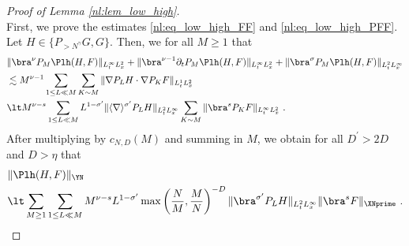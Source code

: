 \documentclass[11pt]{article}
\begin{document}
\begin{proof}[Proof of Lemma \ref{nl:lem_low_high}]~\\
First, we prove the estimates \eqref{nl:eq_low_high_FF} and \eqref{nl:eq_low_high_PFF}. Let \( H \in \{ P_{>N^\gamma} G, G\} \). Then, we for all \( M \geq 1 \) that
\begin{align*}
&\| \bra^\nu P_M \Plh(H,F) \|_{L_t^\infty L_x^2} + \| \bra^{\nu-1} \partial_t P_M \Plh(H,F) \|_{L_t^\infty L_x^2}+ \| \bra^\sigma P_M \Plh(H,F) \|_{L_t^2L_x^\infty} \\
&\lesssim M^{\nu-1} \sum_{1\leq L \ll M} \sum_{K\sim M} \| \nabla P_L H \cdot \nabla P_K F \|_{L_t^1 L_x^2} \\
&\lt M^{\nu-s} \sum_{1\leq L \ll M} L^{1-\sigma^\prime} \| \langle \nabla \rangle^{\sigma^\prime} P_L H \|_{L_t^2 L_x^\infty} \sum_{K\sim M} \| \bra^s P_K F \|_{L_t^\infty L_x^2} ~.
\end{align*}
After multiplying by \( c_{N,D}( M) \) and summing in \( M\), we obtain for all \( D^\prime > 2D \) and \( D>\eta \) that 
\begin{align*}
& \|\Plh(H,F) \|_{\YN} \\
&\lt \sum_{M\geq 1} \sum_{1\leq L \ll M} M^{\nu-s} L^{1-\sigma^\prime} \max \left( \frac{N}{M} , \frac{M}{N} \right)^{-D}  \| \bra^{\sigma^\prime} P_L H \|_{L_t^2 L_x^\infty} \| \bra^s F \|_{\XNprime}~.
\end{align*}


\end{proof}
\end{document}
